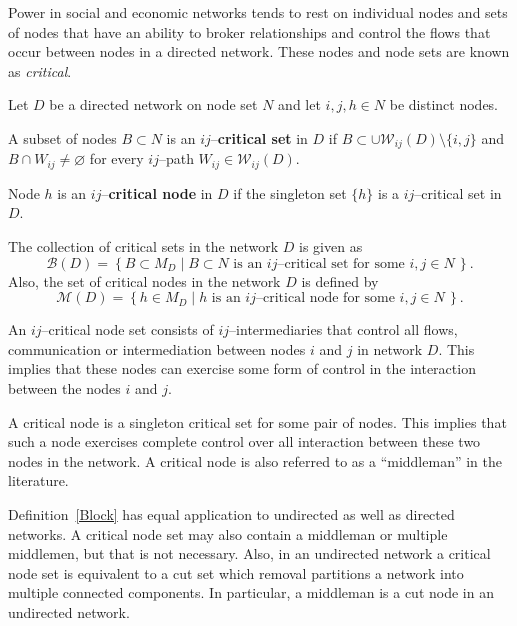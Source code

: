 Power in social and economic networks tends to rest on individual nodes and sets of nodes that have an ability to broker relationships and control the flows that occur between nodes in a directed network. These nodes and node sets are known as \emph{critical}.
\begin{definition} \label{Block}
Let $D$ be a directed network on node set $N$ and let $i,j,h \in N$ be distinct nodes.
\begin{abet}

\item A subset of nodes $B \subset N$ is an $ij$--\textbf{critical set} in $D$ if $B \subset \cup \mathcal{W}_{ij}(D) \setminus \{i,j\}$ and $B \cap W_{ij} \neq \varnothing$ for every $ij$--path $W_{ij} \in \mathcal{W}_{ij}(D)$.

\item Node $h$ is an $ij$--\textbf{critical node} in $D$ if the singleton set $\{ h \}$ is a $ij$--critical set in $D$.

\item The collection of critical sets in the network $D$ is given as
\begin{equation}
\mathcal{B}(D) = \left\{ B \subset M_D \mid B \subset N \mbox{ is an $ij$--critical set for some } i,j \in N \, \right\} .
\end{equation}
Also, the set of critical nodes in the network $D$ is defined by
\begin{equation}
\mathcal{M}(D) = \left\{ h \in M_D \mid h \mbox{ is an $ij$--critical node for some } i,j \in N \, \right\} .
\end{equation}

\end{abet}
\end{definition}
An $ij$--critical node set consists of $ij$--intermediaries that control all flows, communication or intermediation between nodes $i$ and $j$ in network $D$. This implies that these nodes can exercise some form of control in the interaction between the nodes $i$ and $j$.

A critical node is a singleton critical set for some pair of nodes. This implies that such a node exercises complete control over all interaction between these two nodes in the network. A critical node is also referred to as a ``middleman'' in the literature.

Definition~\ref{Block} has equal application to undirected as well as directed networks. A critical node set may also contain a middleman or multiple middlemen, but that is not necessary. Also, in an undirected network a critical node set is equivalent to a cut set which removal partitions a network into multiple connected components. In particular, a middleman is a cut node in an undirected network.

